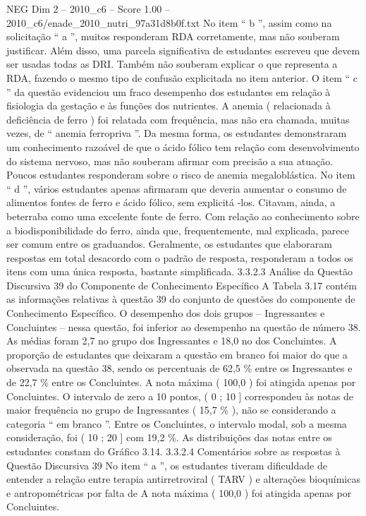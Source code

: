 \begin{textsample}{NEG Dim 2 – 2010\_c6 – Score 1.00 – 2010\_c6/enade\_2010\_nutri\_97a31d8b0f.txt}
No item “ b ”, assim como na solicitação “ a ”, muitos responderam RDA corretamente, mas não souberam justificar.
Além disso, uma parcela significativa de estudantes escreveu que devem ser usadas todas as DRI.
Também não souberam explicar o que representa a RDA, fazendo o mesmo tipo de confusão explicitada no item anterior.
O item “ c ” da questão evidenciou um fraco desempenho dos estudantes em relação à fisiologia da gestação e às funções dos nutrientes.
A anemia ( relacionada à deficiência de ferro ) foi relatada com frequência, mas não era chamada, muitas vezes, de “ anemia ferropriva ”.
Da mesma forma, os estudantes demonstraram um conhecimento razoável de que o ácido fólico tem relação com desenvolvimento do sistema nervoso, mas não souberam afirmar com precisão a sua atuação.
Poucos estudantes responderam sobre o risco de anemia megaloblástica.
No item “ d ”, vários estudantes apenas afirmaram que deveria aumentar o consumo de alimentos fontes de ferro e ácido fólico, sem explicitá -los.
Citavam, ainda, a beterraba como uma excelente fonte de ferro.
Com relação ao conhecimento sobre a biodisponibilidade do ferro, ainda que, frequentemente, mal explicada, parece ser comum entre os graduandos.
Geralmente, os estudantes que elaboraram respostas em total desacordo com o padrão de resposta, responderam a todos os itens com uma única resposta, bastante simplificada. 3.3.2.3 Análise da Questão Discursiva 39 do Componente de Conhecimento Específico A Tabela 3.17 contém as informações relativas à questão 39 do conjunto de questões do componente de Conhecimento Específico.
O desempenho dos dois grupos – Ingressantes e Concluintes – nessa questão, foi inferior ao desempenho na questão de número 38.
As médias foram 2,7 no grupo dos Ingressantes e 18,0 no dos Concluintes.
A proporção de estudantes que deixaram a questão em branco foi maior do que a observada na questão 38, sendo os percentuais de 62,5 \% entre os Ingressantes e de 22,7 \% entre os Concluintes.
A nota máxima ( 100,0 ) foi atingida apenas por Concluintes.
O intervalo de zero a 10 pontos, ( 0 ; 10 ] correspondeu às notas de maior frequência no grupo de Ingressantes ( 15,7 \% ), não se considerando a categoria “ em branco ”.
Entre os Concluintes, o intervalo modal, sob a mesma consideração, foi ( 10 ; 20 ] com 19,2 \%.
As distribuições das notas entre os estudantes constam do Gráfico 3.14. 3.3.2.4 Comentários sobre as respostas à Questão Discursiva 39 No item “ a ”, os estudantes tiveram dificuldade de entender a relação entre terapia antirretroviral ( TARV ) e alterações bioquímicas e antropométricas por falta de A nota máxima ( 100,0 ) foi atingida apenas por Concluintes.

\end{textsample}
